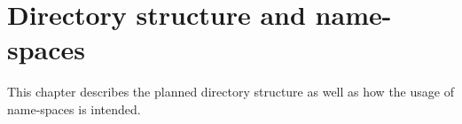 \documentclass[
    a4paper,      %
    10pt,         %
    openright,    %
    notitlepage,  %
    parskip=half, %
]{scrreprt}       %
\theoremstyle{definition}                    %
\begin{document}
\section{Directory structure and name-spaces}
\label{sec:directory-structure}

This chapter describes the planned directory structure as well as how the usage
of name-spaces is intended.

% 
% 
% 
% 
\end{document}
